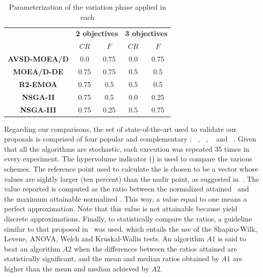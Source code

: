\begin{table}[t]
\centering
\caption{Parameterization of the variation phase applied in each \MOEA{}}
\label{tab:tunning}
\begin{scriptsize}
\begin{tabular}{|c|c|c|c|c|}
\hline
\multirow{2}{*}{} &\multicolumn{2}{c|}{ \textbf{2 objectives} }& \multicolumn{2}{c|}{\textbf{3 objectives} }\\ \cline{2-5} 
 & $CR$ & $F$ & $CR$ & $F$ \\ \hline
\textbf{AVSD-MOEA/D} & 0.0 & 0.75 & 0.0 & 0.75 \\ \hline
\textbf{MOEA/D-DE} & 0.75 & 0.75 & 0.5 & 0.5 \\ \hline
\textbf{R2-EMOA} & 0.75 & 0.5 & 0.5 & 0.5 \\ \hline
\textbf{NSGA-II} & 0.75 & 0.5 & 0.0 & 0.25 \\ \hline
\textbf{NSGA-III} & 0.75 & 0.25 & 0.5 & 0.75 \\ \hline
\end{tabular}%
\end{scriptsize}
\end{table}

Regarding our comparisons, the set of state-of-the-art \MOEAS{} used to validate our proposals is comprised of four 
popular and complementary \MOEAS{}: \NSGAII{}~\cite{deb2002fast}, \MOEADDE{}~\cite{zhang2009performance}, \RMOEA{}~\cite{trautmann2013r2} 
and \NSGAIII{}~\cite{deb2013evolutionary}.
%
Given that all the algorithms are stochastic, each execution was repeated $35$ times in every experiment.
%
The hypervolume indicator (\HV{}) is used to compare the various schemes.
%
The reference point used to calculate the \HV{} is chosen to be a vector whose values are sightly larger (ten percent) 
than the nadir point, as suggested in~\cite{ishibuchi2017reference}.
%
The value reported is computed as the ratio between the normalized \HV{} attained~\cite{li2014evolutionary} 
and the maximum attainable normalized \HV{}.
%
This way, a value equal to one means a perfect approximation.
%
Note that this value is not attainable because \MOEAS{} yield discrete approximations.
%
Finally, to statistically compare the \HV{} ratios, a guideline similar to that proposed in~\cite{durillo2010study} was used, 
which entails the use of the Shapiro-Wilk, Levene, ANOVA, Welch and Kruskal-Wallis tests.
%
An algorithm $A1$ is said to beat an algorithm $A2$ when the differences between the \HV{} ratios attained are statistically significant, 
and the mean and median \HV{} ratios obtained by $A1$ are higher than the mean and median achieved by $A2$.



